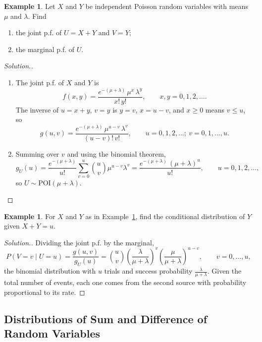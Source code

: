 \documentclass[12pt,a4paper]{report}
\theoremstyle{definition}
\newtheorem{example}[thm]{Example}
\theoremstyle{plain}
\newenvironment{solution}
  {\renewcommand{\qedsymbol}{}\begin{proof}[\textit{Solution}.]}
  {\end{proof}}
\begin{document}
\begin{example}
\label{ex:poissonsum}
Let $X$ and $Y$ be independent Poisson random variables with means $\mu$ and
$\lambda$. Find
\begin{enumerate}
\item[(i)] the joint p.f. of $U = X + Y$ and $V = Y$;
\item[(ii)] the marginal p.f. of $U$.
\end{enumerate}
\end{example}

\begin{solution}
\begin{enumerate}
\item[(i)] The joint p.f. of $X$ and $Y$ is
\[f(x,y) = \frac{e^{-(\mu + \lambda)}\, \mu^x\, \lambda^y}{x!\, y!} ,\qquad x,
y = 0, 1, 2, \dots .\]
The inverse of $u = x + y$, $v = y$ is $y = v$, $x = u - v$, and $x\geq 0$ means
$v\leq u$, so
\[g(u,v) = \frac{e^{-(\mu + \lambda)}\, \mu^{u-v}\, \lambda^v}{(u - v)!\, v!}
,\qquad u = 0, 1, 2, \dots ;\ v = 0, 1, \dots, u .\]

\item[(ii)] Summing over $v$ and using the binomial theorem,
\[g_U(u) = \frac{e^{-(\mu + \lambda)}}{u!}\sum_{v = 0}^u\binom{u}{v}\mu^{u -
v}\lambda^v = \frac{e^{-(\mu + \lambda)}\,(\mu + \lambda)^u}{u!} ,\qquad u = 0, 1,
2, \dots ,\]
so $U\sim\text{POI}(\mu + \lambda)$.
\end{enumerate}
\end{solution}

\begin{example}
\label{ex:poissonconditional}
For $X$ and $Y$ as in Example~\ref{ex:poissonsum}, find the conditional
distribution of $Y$ given $X + Y = u$.
\end{example}

\begin{solution}
Dividing the joint p.f. by the marginal,
\[P(V = v\mid U = u) = \frac{g(u,v)}{g_U(u)} = \binom{u}{v}\left(\frac{\lambda}{\mu
+ \lambda}\right)^v\left(\frac{\mu}{\mu + \lambda}\right)^{u - v},\qquad v =
0,\dots,u ,\]
the binomial distribution with $u$ trials and success probability
$\frac{\lambda}{\mu + \lambda}$. Given the total number of events, each one comes
from the second source with probability proportional to its rate.
\end{solution}

\subsection{Distributions of Sum and Difference of Random Variables}
\end{document}
